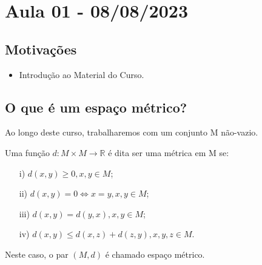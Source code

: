\documentclass[metric_notes.tex]{subfiles}
\begin{document}
\section{Aula 01 - 08/08/2023}
\subsection{Motivações}
\begin{itemize}
	\item Introdução ao Material do Curso.
\end{itemize}
\subsection*{O que é um espaço métrico?}
Ao longo deste curso, trabalharemos com um conjunto M não-vazio.
\hypertarget{def_metric}{ \begin{def*}
		Uma função \(d:M\times M\rightarrow \mathbb{R}\) é dita ser uma métrica em M se:
		\begin{itemize}
			\item[i)] \(d(x, y)\geq 0, x, y\in M\);
			\item[ii)] \(d(x, y) = 0 \Leftrightarrow x = y, x, y\in M\);
			\item[iii)] \(d(x, y) = d(y, x), x, y\in M\);
			\item[iv)] \(d(x, y)\leq d(x, z) + d(z, y), x, y, z\in M\).
		\end{itemize}
		Neste caso, o par \((M, d)\) é chamado espaço métrico.
	\end{def*}
}
\end{document}
